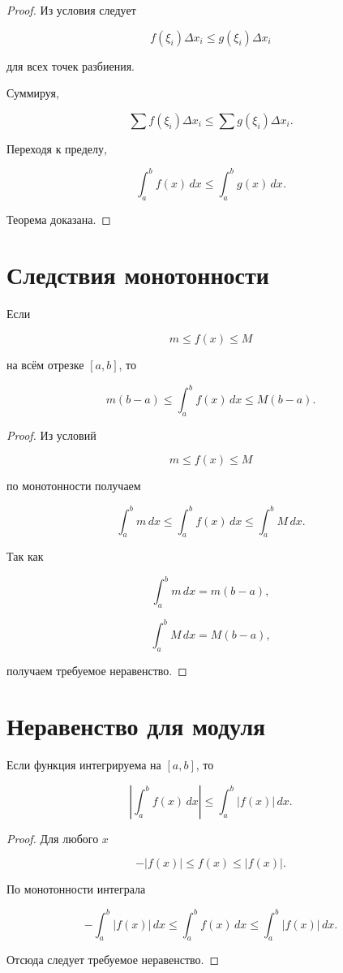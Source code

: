 \documentclass[14pt]{extreport}
\begin{document}
\begin{proof}

Из условия следует

\[
f(\xi_i)\Delta x_i
\le
g(\xi_i)\Delta x_i
\]

для всех точек разбиения.

Суммируя,

\[
\sum f(\xi_i)\Delta x_i
\le
\sum g(\xi_i)\Delta x_i.
\]

Переходя к пределу,

\[
\int_a^b f(x)\,dx
\le
\int_a^b g(x)\,dx.
\]

Теорема доказана.
\end{proof}

\section{Следствия монотонности}

Если

\[
m\le f(x)\le M
\]

на всём отрезке $[a,b]$, то

\[
m(b-a)
\le
\int_a^b f(x)\,dx
\le
M(b-a).
\]

\begin{proof}

Из условий

\[
m\le f(x)\le M
\]

по монотонности получаем

\[
\int_a^b m\,dx
\le
\int_a^b f(x)\,dx
\le
\int_a^b M\,dx.
\]

Так как

\[
\int_a^b m\,dx=m(b-a),
\]

\[
\int_a^b M\,dx=M(b-a),
\]

получаем требуемое неравенство.
\end{proof}

\section{Неравенство для модуля}

\begin{theorem}

Если функция интегрируема на $[a,b]$, то

\[
\boxed{
\left|
\int_a^b f(x)\,dx
\right|
\le
\int_a^b |f(x)|\,dx.
}
\]

\end{theorem}

\begin{proof}

Для любого $x$

\[
-|f(x)|
\le
f(x)
\le
|f(x)|.
\]

По монотонности интеграла

\[
-\int_a^b |f(x)|\,dx
\le
\int_a^b f(x)\,dx
\le
\int_a^b |f(x)|\,dx.
\]

Отсюда следует требуемое неравенство.
\end{proof}
\end{document}

